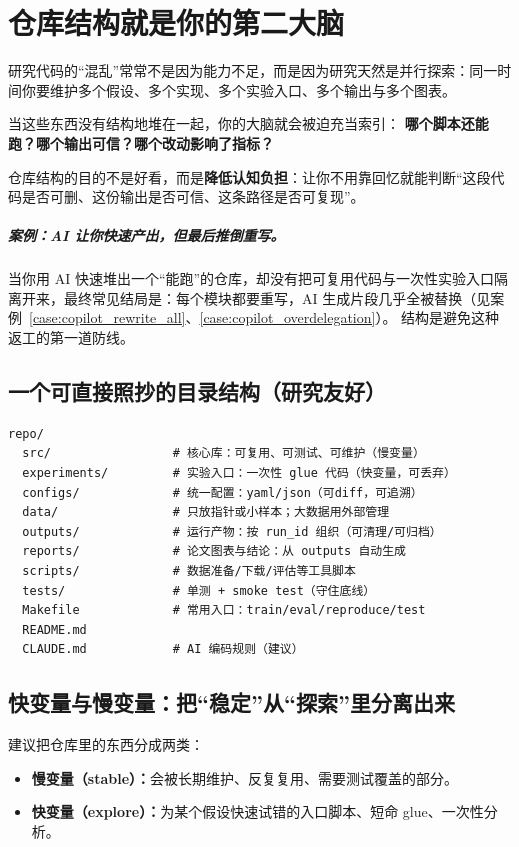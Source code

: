 \chapter{仓库结构就是你的第二大脑}
\label{ch:repo_layout}

研究代码的“混乱”常常不是因为能力不足，而是因为研究天然是并行探索：同一时间你要维护多个假设、多个实现、多个实验入口、多个输出与多个图表。

当这些东西没有结构地堆在一起，你的大脑就会被迫充当索引：
\textbf{哪个脚本还能跑？哪个输出可信？哪个改动影响了指标？}

仓库结构的目的不是好看，而是\textbf{降低认知负担}：让你不用靠回忆就能判断“这段代码是否可删、这份输出是否可信、这条路径是否可复现”。

\paragraph{案例：AI 让你快速产出，但最后推倒重写。}
当你用 AI 快速堆出一个“能跑”的仓库，却没有把可复用代码与一次性实验入口隔离开来，最终常见结局是：每个模块都要重写，AI 生成片段几乎全被替换（见案例~\ref{case:copilot_rewrite_all}、\ref{case:copilot_overdelegation}）。
结构是避免这种返工的第一道防线。

\section{一个可直接照抄的目录结构（研究友好）}
\begin{verbatim}
repo/
  src/                 # 核心库：可复用、可测试、可维护（慢变量）
  experiments/         # 实验入口：一次性 glue 代码（快变量，可丢弃）
  configs/             # 统一配置：yaml/json（可diff，可追溯）
  data/                # 只放指针或小样本；大数据用外部管理
  outputs/             # 运行产物：按 run_id 组织（可清理/可归档）
  reports/             # 论文图表与结论：从 outputs 自动生成
  scripts/             # 数据准备/下载/评估等工具脚本
  tests/               # 单测 + smoke test（守住底线）
  Makefile             # 常用入口：train/eval/reproduce/test
  README.md
  CLAUDE.md            # AI 编码规则（建议）
\end{verbatim}

\section{快变量与慢变量：把“稳定”从“探索”里分离出来}
建议把仓库里的东西分成两类：
\begin{itemize}
  \item \textbf{慢变量（stable）：}会被长期维护、反复复用、需要测试覆盖的部分。
  \item \textbf{快变量（explore）：}为某个假设快速试错的入口脚本、短命 glue、一次性分析。
\end{itemize}

